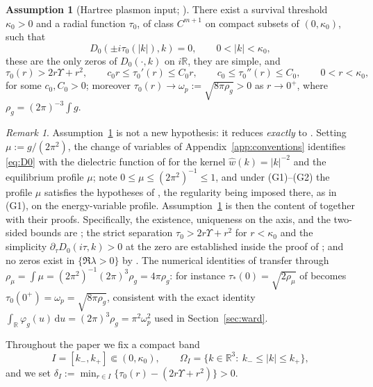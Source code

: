 \documentclass[11pt,a4paper]{amsart}
\theoremstyle{definition}
\newtheorem{assumption}[theorem]{Assumption}
\theoremstyle{remark}
\newtheorem{remark}[theorem]{Remark}
\newcommand{\R}{\mathbb{R}}
\newcommand{\dd}{\,\mathrm{d}}
\begin{document}
\begin{assumption}[Hartree plasmon input; \cite{NY1}]\label{ass:input}
There exist a survival threshold $\kappa_0>0$ and a radial function $\tau_0$, of class $C^{m+1}$ on compact subsets of $(0,\kappa_0)$, such that
\begin{equation}\label{eq:inputzeros}
D_0(\pm i\tau_0(|k|),k)=0,\qquad 0<|k|<\kappa_0,
\end{equation}
these are the only zeros of $D_0(\cdot,k)$ on $i\R$, they are simple, and
\begin{equation}\label{eq:inputbounds}
\tau_0(r)>2r\Upsilon+r^2,\qquad
c_0 r\le \tau_0'(r)\le C_0 r,\qquad
c_0\le\tau_0''(r)\le C_0,\qquad 0<r<\kappa_0,
\end{equation}
for some $c_0,C_0>0$; moreover $\tau_0(r)\to\omega_p:=\sqrt{8\pi\rho_g}>0$ as $r\to0^+$, where $\rho_g=(2\pi)^{-3}\int g$.
\end{assumption}

\begin{remark}\label{rem:inputjustified}
Assumption~\ref{ass:input} is not a new hypothesis: it reduces \emph{exactly} to \cite{NY1}. Setting $\mu:=g/(2\pi^2)$, the change of variables of Appendix~\ref{app:conventions} identifies \eqref{eq:D0} with the dielectric function of \cite{NY1} for the kernel $\widehat w(k)=|k|^{-2}$ and the equilibrium profile $\mu$; note $0\le\mu\le(2\pi^2)^{-1}\le1$, and under \textup{(G1)--(G2)} the profile $\mu$ satisfies the hypotheses of \cite[Section~1.4]{NY1}, the regularity being imposed there, as in \textup{(G1)}, on the energy-variable profile. Assumption~\ref{ass:input} is then the content of \cite[Theorems~1.1 and~2.6]{NY1} together with their proofs. Specifically, the existence, uniqueness on the axis, and the two-sided bounds are \cite[Theorem~2.6 and (2.24)]{NY1}; the strict separation $\tau_0>2r\Upsilon+r^2$ for $r<\kappa_0$ and the simplicity $\partial_\tau D_0(i\tau,k)>0$ at the zero are established inside the proof of \cite[Theorem~2.6]{NY1}; and no zeros exist in $\{\Re\lambda>0\}$ by \cite[Theorem~1.1]{NY1}. The numerical identities of \cite{NY1} transfer through $\rho_\mu=\int\mu=(2\pi^2)^{-1}(2\pi)^3\rho_g=4\pi\rho_g$: for instance $\tau_*(0)=\sqrt{2\rho_\mu}$ of \cite[(1.17)]{NY1} becomes $\tau_0(0^+)=\omega_p=\sqrt{8\pi\rho_g}$, consistent with the exact identity $\int_{\R}\varphi_g(u)\dd u=(2\pi)^3\rho_g=\pi^2\omega_p^2$ used in Section~\ref{sec:ward}.
\end{remark}

Throughout the paper we fix a compact band
\begin{equation}\label{eq:band}
I=[k_-,k_+]\Subset(0,\kappa_0),\qquad
\Omega_I=\{k\in\R^3:\ k_-\le|k|\le k_+\},
\end{equation}
and we set $\delta_I:=\min_{r\in I}\bigl\{\tau_0(r)-(2r\Upsilon+r^2)\bigr\}>0$.
\end{document}

